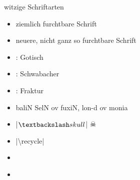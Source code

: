 \documentclass[
	vorläufig=false,
	datum=2021-12-22,
	titel={Witziges, Obskures und Sinnvolles…},
	web=false,
 	aspectratio=1610,
 	max,
]{../tex/latexkurs-slides}
\begin{document}
\begin{frame}{witzige Schriftarten}
	\begin{itemize}[<+->]
		\item {}\hfill{ ziemlich furchtbare Schrift}
		\item {}\hfill{\comicneue neuere, nicht ganz so furchtbare Schrift}
                \item {}: Gotisch\hfill{}
                \item {}: Schwabacher\hfill{}
                \item {}: Fraktur\hfill{}
		\item {}\hfill{\cirth baliN SelN ov fuxiN, lon-d ov monia}
		\item {}\hfill{|$\textbackslash skull$| \quad \Large \(\skull\)}
                \item {}\hfill{|\textbackslash recycle| \quad \small \recycle}
		\item {}\hfill{\Large{}}
		\vspace{-.8em}

		\item {}\hfill{}\hspace{-2ex}\,
	\end{itemize}
\end{frame}

\end{document}
